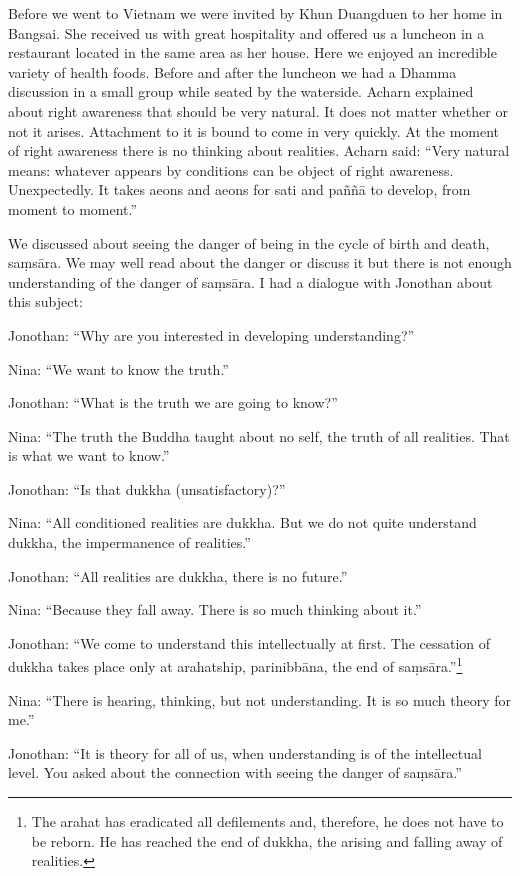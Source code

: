 Before we went to Vietnam we were invited by Khun Duangduen to her home
in Bangsai. She received us with great hospitality and offered us a
luncheon in a restaurant located in the same area as her house. Here we
enjoyed an incredible variety of health foods. Before and after the
luncheon we had a Dhamma discussion in a small group while seated by the
waterside. Acharn explained about right awareness that should be very
natural. It does not matter whether or not it arises. Attachment to it
is bound to come in very quickly. At the moment of right awareness there
is no thinking about realities. Acharn said: ``Very natural means:
whatever appears by conditions can be object of right awareness.
Unexpectedly. It takes aeons and aeons for sati and paññā to develop,
from moment to moment.''

We discussed about seeing the danger of being in the cycle of birth and
death, saṃsāra. We may well read about the danger or discuss it but
there is not enough understanding of the danger of saṃsāra. I had a
dialogue with Jonothan about this subject:

Jonothan: ``Why are you interested in developing understanding?''

Nina: ``We want to know the truth.''

Jonothan: ``What is the truth we are going to know?''

Nina: ``The truth the Buddha taught about no self, the truth of all
realities. That is what we want to know.''

Jonothan: ``Is that dukkha (unsatisfactory)?''

Nina: ``All conditioned realities are dukkha. But we do not quite
understand dukkha, the impermanence of realities.''

Jonothan: ``All realities are dukkha, there is no future.''

Nina: ``Because they fall away. There is so much thinking about it.''

Jonothan: ``We come to understand this intellectually at first. The
cessation of dukkha takes place only at arahatship, parinibbāna, the end
of saṃsāra.''\footnote{The arahat has
eradicated all defilements and, therefore, he does not have to be
reborn. He has reached the end of dukkha, the arising and falling away
of realities.}

Nina: ``There is hearing, thinking, but not understanding. It is so much
theory for me.''

Jonothan: ``It is theory for all of us, when understanding is of the
intellectual level. You asked about the connection with seeing the
danger of saṃsāra.''

